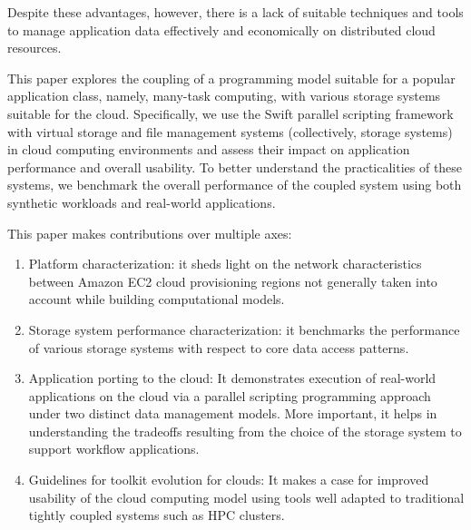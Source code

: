 \documentclass[10pt,journal,cspaper,compsoc]{IEEEtran}
\begin{document}
Despite these advantages, however, there is a lack of suitable techniques and
tools to manage application data effectively and economically on distributed
cloud resources.

This paper explores the coupling of a programming model suitable for a popular
application class, namely, many-task computing, with various storage
systems suitable for the cloud. Specifically, we use the Swift
parallel scripting framework with virtual storage and file management systems
(collectively, storage systems) in cloud computing environments and
assess their impact on application performance and overall usability. To better
understand the practicalities of these systems, we benchmark the overall
performance of the coupled system using both synthetic workloads and real-world
applications.

This paper makes contributions over multiple axes: 

\begin{enumerate}
\item Platform characterization: it sheds light on the network characteristics
    between Amazon EC2 cloud provisioning regions not generally taken into
    account while building computational models.

\item Storage system performance characterization: it benchmarks the
performance of various storage systems with respect to core data
access patterns. 

\item Application porting to the cloud: It demonstrates execution of real-world
applications on the cloud via a parallel scripting programming approach under
two distinct data management models. More important, it helps in
understanding the tradeoffs resulting from the choice of the storage
system to support workflow applications. 

\item Guidelines for toolkit evolution for clouds: It makes a case for
improved usability of the cloud computing model using tools well adapted to
traditional tightly coupled systems such as HPC clusters. 
\end{enumerate}

\usetikzlibrary{arrows,shapes,positioning,shadows,trees}
\end{document}
